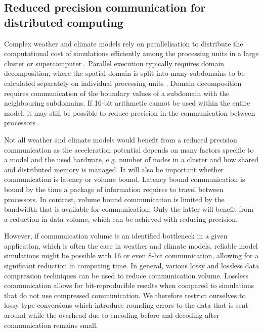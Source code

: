 \subsection{Reduced precision communication for distributed computing}
\label{sec:swm_comm}

Complex weather and climate models rely on parallelisation to distribute the computational cost of simulations efficiently among
the processing units in a large cluster or supercomputer \citep{Fuhrer2018}. Parallel execution typically requires domain
decomposition, where the spatial domain is split into many subdomains to be calculated separately on individual processing units
\citep{Chan1994,Toselli2004}. Domain decomposition requires communication of the boundary values of a subdomain with the
neighbouring subdomains. If 16-bit arithmetic cannot be used within the entire model, it may still be possible to reduce precision
in the communication between processors \citep{Fan2019}.

Not all weather and climate models would benefit from a reduced precision communication as the acceleration potential depends
on many factors specific to a model and the used hardware, e.g. number of nodes in a cluster and how shared and distributed
memory is managed. It will also be important whether communication is latency or volume bound. Latency bound communication
is bound by the time a package of information requires to travel between processors. In contrast, volume bound communication
is limited by the bandwidth that is available for communication. Only the latter will benefit from a reduction in data volume, which
can be achieved with reducing precision.

However, if communication volume is an identified bottleneck in a given application, which is often the case in weather and
climate models, reliable model simulations might be possible with 16 or even 8-bit communication, allowing for a significant
reduction in computing time. In general, various lossy and lossless data compression techniques can be used to reduce
communication volume. Lossless communication allows for bit-reproducible results when compared to simulations that
do not use compressed communication. We therefore restrict ourselves to lossy type conversions which introduce rounding
errors to the data that is sent around while the overhead due to encoding before and decoding after communication remains
small.

